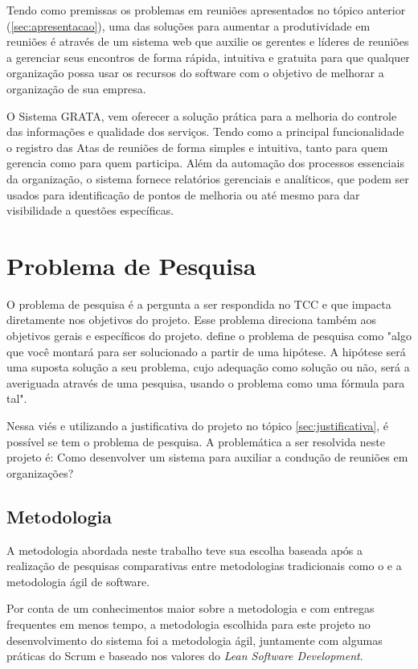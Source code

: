 Tendo como premissas os problemas em reuniões apresentados no tópico anterior (\ref{sec:apresentacao}), uma das soluções para aumentar a produtividade em reuniões é através de um sistema web que auxilie os gerentes e líderes de reuniões a gerenciar seus encontros de forma rápida, intuitiva e gratuita para que qualquer organização possa usar os recursos do software com o objetivo de melhorar a organização de sua empresa.

O Sistema GRATA, vem oferecer a solução prática para a melhoria do controle das informações e qualidade dos serviços. Tendo como a principal funcionalidade o registro das Atas de reuniões de forma simples e intuitiva, tanto para quem gerencia como para quem participa. Além da automação dos processos essenciais da organização, o sistema fornece relatórios gerenciais e analíticos, que podem ser usados para identificação de pontos de melhoria ou até mesmo para dar visibilidade a questões específicas.

\section{Problema de Pesquisa}
\label{sec:problema_de_pesquisa}

O problema de pesquisa é a pergunta a ser respondida no TCC e que impacta diretamente nos objetivos do projeto. Esse problema direciona também aos objetivos gerais e específicos do projeto. \cite{gomides} define o problema de pesquisa como "algo que você montará para ser solucionado a partir de uma hipótese. A hipótese será uma suposta solução a seu problema, cujo adequação como solução ou não, será a averiguada através de uma pesquisa, usando o problema como uma fórmula para tal".

Nessa viés e utilizando a justificativa do projeto no tópico \ref{sec:justificativa}, é possível se tem o problema de pesquisa. A problemática a ser resolvida neste projeto é: Como desenvolver um sistema para auxiliar a condução de reuniões em organizações?

\subsection{Metodologia}
\label{sec:metodologia_introducao}

A metodologia abordada neste trabalho teve sua escolha baseada após a realização de pesquisas comparativas entre metodologias tradicionais como o \cite{pmbok} e a metodologia ágil de software.

Por conta de um conhecimentos maior sobre a metodologia e com entregas frequentes em menos tempo, a metodologia escolhida para este projeto no desenvolvimento do sistema foi a metodologia ágil, juntamente com algumas práticas do Scrum e baseado nos valores do \textit{Lean Software Development}.  

